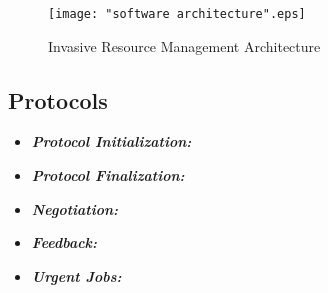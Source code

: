 \documentclass[a4paper, 12pt]{article}
\begin{document}
\clearpage
\begin{figure}[h]
\centering
\vspace{-0.15in}
\texttt{[image: "software architecture".eps]}
\caption{Invasive Resource Management Architecture}
\label{fig:7}
\end{figure}
\clearpage
\subsection{Protocols}
\begin{itemize}
\item \textbf{\textit{Protocol Initialization:}}
\item \textbf{\textit{Protocol Finalization:}}
\item \textbf{\textit{Negotiation:}}
\item \textbf{\textit{Feedback:}}
\item \textbf{\textit{Urgent Jobs:}}
\end{itemize}
\clearpage
\end{document}
